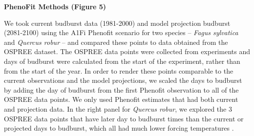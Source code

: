 \documentclass{article}
\begin{document}
\par \textbf{PhenoFit Methods (Figure 5)}
\par We took current budburst data (1981-2000) and model projection budburst (2081-2100) using the A1Fi Phenofit scenario for two species -- \textit{Fagus sylvatica} and \textit{Quercus robur} -- and compared these points to data obtained from the OSPREE dataset. The OSPREE data points were collected from experiments and days of budburst were calculated from the start of the experiment, rather than from the start of the year. In order to render these points comparable to the current observations and the model projections, we scaled the days to budburst by adding the day of budburst from the first Phenofit observation to all of the OSPREE data points. We only used Phenofit estimates that had both current and projection data. In the right panel for \textit{Quercus robur}, we explored the 3 OSPREE data points that have later day to budburst times than the current or projected days to budburst, which all had much lower forcing temperatures \citep[][3.8-5.7$^{\circ}$]{morin10}.
\end{document}

